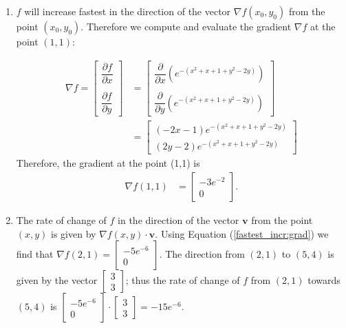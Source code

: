 \item
{}
 \begin{enumerate}
  \item $f$ will increase fastest in the direction of the vector
   $\nabla f(x_0,y_0)$ from the point $(x_0, y_0)$.  Therefore we compute and
   evaluate the gradient $\nabla f$ at the point $(1, 1)$:

   \begin{align*}
    \nabla f = \begin{bmatrix}
                 \dfrac{\partial f}{\partial x} \\\\
                 \dfrac{\partial f}{\partial y}
                \end{bmatrix} 
             &= \begin{bmatrix}
                 \dfrac{\partial}{\partial x}(e^{-(x^2+x+1+y^2-2y)}) \\\\
                 \dfrac{\partial}{\partial y}(e^{-(x^2+x+1+y^2-2y)})
                \end{bmatrix} \tag{1} \label{fastest_incr:grad}  \\
             &= \begin{bmatrix}
                 (-2x - 1)e^{-(x^2+x+1+y^2-2y)} \\
                 (2y - 2)e^{-(x^2+x+1+y^2-2y)}
                \end{bmatrix}
   \end{align*}
   Therefore, the gradient at the point (1,1) is
   \begin{align*}        
    \nabla f(1, 1) &= \begin{bmatrix} -3e^{-2} \\ 0 \end{bmatrix}.
   \end{align*}
 \item The rate of change of $f$ in the direction of the vector $\mathbf{v}$
  from the point $(x, y)$ is given by $\nabla f(x,y) \cdot \mathbf{v}$.  Using
  Equation (\ref{fastest_incr:grad}) we find that $\nabla f(2, 1) =
  \begin{bmatrix} -5e^{-6} \\ 0 \end{bmatrix}$.  The direction from $(2, 1)$
  to $(5, 4)$ is given by the vector $\begin{bmatrix} 3 \\ 3 \end{bmatrix}$;
  thus the rate of change of $f$ from $(2, 1)$ towards $(5, 4)$ is
  $\begin{bmatrix} -5e^{-6} \\ 0 \end{bmatrix} \cdot
   \begin{bmatrix} 3 \\ 3 \end{bmatrix} = -15e^{-6}$.

 \end{enumerate}

